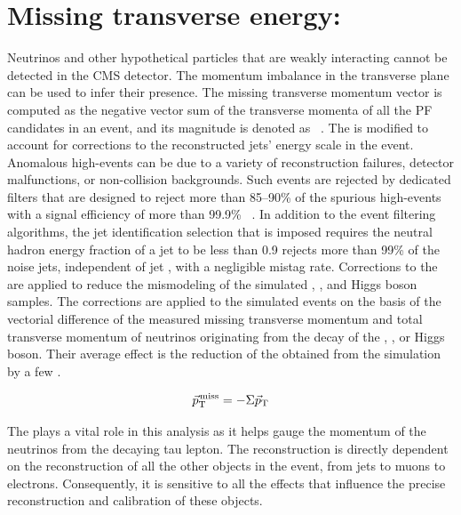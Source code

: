 \section{Missing transverse energy: \ptvecmiss}
\label{mt_met_recon}
Neutrinos and other hypothetical particles that are weakly interacting cannot be detected in the CMS detector. The momentum imbalance in the transverse plane can be used to infer their presence. The missing transverse momentum vector \ptvecmiss is computed as the negative vector sum of the transverse momenta of all the PF candidates in an event, and its magnitude is denoted as \ptmiss ~\cite{Sirunyan:2019kia}. The \ptvecmiss is modified to account for corrections to the reconstructed jets' energy scale in the event. Anomalous high-\ptmiss events can be due to a variety of reconstruction failures, detector malfunctions, or non-collision backgrounds. Such events are rejected by dedicated filters that are designed to reject more than 85--90\% of the spurious high-\ptmiss events with a signal efficiency of more than 99.9\% ~\cite{Sirunyan:2019kia}. In addition to the event filtering algorithms, the jet identification selection that is imposed requires the neutral hadron energy fraction of a jet to be less than 0.9 rejects more than 99\% of the noise jets, independent of jet \pt, with a negligible mistag rate. Corrections to the \ptvecmiss are applied to reduce the mismodeling of the simulated \zjets, \wjets, and Higgs boson samples. The corrections are applied to the simulated events on the basis of the vectorial difference of the measured missing transverse momentum and total transverse momentum of neutrinos originating from the decay of the \PZ, \PW, or Higgs boson. Their average effect is the reduction of the \ptmiss obtained from the simulation by a few \GeV.

\begin{equation}
  {\vec p}_{\mathrm{T}}^{\kern1pt\text{miss}}=-\Sigma{\vec p}_{\mathrm{T}}
\end{equation}

The \ptvecmiss plays a vital role in this analysis as it helps gauge the momentum of the neutrinos from the decaying tau lepton. The \ptvecmiss reconstruction is directly dependent on the reconstruction of all the other objects in the event, from jets to muons to electrons. Consequently, it is sensitive to all the effects that influence the precise reconstruction and calibration of these objects.


